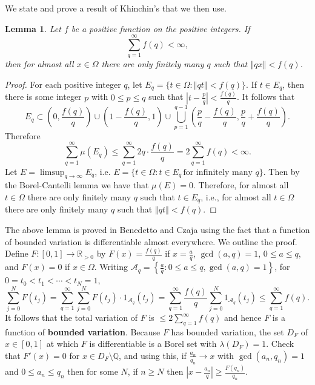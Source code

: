 \documentclass{article}
\newcommand{\norm}[1]{\left\Vert #1 \right\Vert}
\newtheorem{lemma}[theorem]{Lemma}
\begin{document}
We  state and prove a result of Khinchin's \cite[p.~69, Theorem 32]{MR1451873}  that we  then use. 

\begin{lemma}
Let $f$ be a positive function on the positive integers. If
\[
\sum_{q=1}^\infty f(q)<\infty,
\]
then for almost all $x \in \Omega$ there are only finitely many $q$ such that $\norm{qx}<f(q)$.
\label{khinchin}
\end{lemma}
\begin{proof}
For each positive integer $q$, let $E_q=\{t\in \Omega: \norm{qt} < f(q)\}$. If $t \in E_q$, then there is some integer $p$ with $0 \leq p  \leq q$ such that $\left| t-\frac{p}{q} \right| < \frac{f(q)}{q}$. It follows that
\[
E_q \subset \left(0,\frac{f(q)}{q} \right) \cup \left(1-\frac{f(q)}{q}, 1 \right)  \cup \bigcup_{p=1}^{q-1} \left(\frac{p}{q}-\frac{f(q)}{q},\frac{p}{q}+\frac{f(q)}{q} \right).
\]
Therefore
\[
\sum_{q=1}^\infty \mu(E_q)  \leq  \sum_{q=1}^\infty 
2q \cdot \frac{f(q)}{q}=2\sum_{q=1}^\infty f(q) < \infty.
\]
Let $E=\limsup_{q \to \infty} E_q$, i.e. $E=\{t \in \Omega : t \in E_q \, \textrm{for infinitely many $q$}\}$. Then by the Borel-Cantelli lemma \cite[p.~59, Theorem 4.3]{billingsley} we have that $\mu(E)=0$. Therefore, for almost all $t \in \Omega$ there are only finitely many $q$ such that $t \in E_q$, i.e., for almost all $t \in \Omega$ there are only finitely many $q$ such that $\norm{qt} < f(q)$.
\end{proof}

The above lemma is  proved in
Benedetto and Czaja \cite[p.~183, Theorem 4.3.3]{benedetto} using
the fact that a function of bounded variation is differentiable almost everywhere. We outline the proof. Define $F:[0,1] \to \mathbb{R}_{>0}$ by 
$F(x) = \frac{f(q)}{q}$ if $x=\frac{a}{q}$, $\gcd(a,q)=1$, $0 \leq a \leq q$, and $F(x)=0$ if $x \in \Omega$. 
Writing $\mathscr{A}_q = \left\{\frac{a}{q}: 0 \leq a \leq q, \gcd(a,q)=1\right\}$,
for $0=t_0<t_1<\cdots<t_N=1$,
\[
\sum_{j=0}^N F(t_j) =   \sum_{q=1}^\infty \sum_{j=0}^N F(t_j) \cdot 1_{\mathscr{A}_q}(t_j) = 
\sum_{q=1}^\infty \frac{f(q)}{q} \sum_{j=0}^N 1_{\mathscr{A}_q}(t_j) \leq \sum_{q=1}^\infty f(q).
\]
It follows that the total variation of $F$ is
$\leq 2 \sum_{q=1}^\infty f(q)$ and hence $F$ is a function of \textbf{bounded variation}. Because $F$ has bounded variation, the set $D_F$ of
$x \in [0,1]$ at which $F$ is differentiable is a Borel set with $\lambda(D_F)=1$. Check that $F'(x)=0$ for $x \in D_F \setminus \mathbb{Q}$, and using this,
if
$\frac{a_n}{q_n} \to x$ with $\gcd(a_n,q_n)=1$ and $0 \leq a_n \leq q_n$ then for some $N$, if $n \geq N$ then
$\left|x-\frac{a_n}{q} \right| \geq \frac{F(q_n)}{q_n}$.
\end{document}
